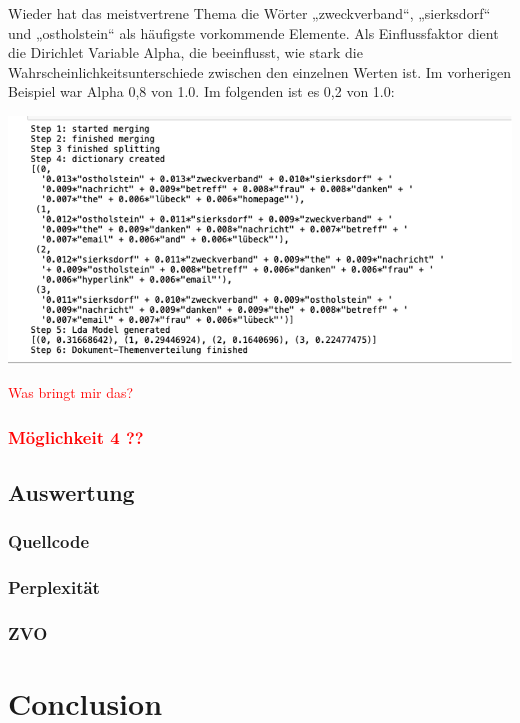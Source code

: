 \documentclass[german,version-2020-11]{uzl-thesis}
\begin{document}
Wieder hat das meistvertrene Thema die Wörter „zweckverband“, „sierksdorf“ und „ostholstein“ als häufigste vorkommende Elemente. Als Einflussfaktor dient die Dirichlet Variable Alpha, die beeinflusst, wie stark die Wahrscheinlichkeitsunterschiede zwischen den einzelnen Werten ist. Im vorherigen Beispiel war Alpha 0,8 von 1.0. Im folgenden ist es 0,2 von 1.0: 

\includegraphics[scale=0.5]{lda5.png}

\textcolor{red}{Was bringt mir das?}

\subsection{\textcolor{red}{Möglichkeit 4 ??}}

\section{Auswertung}
	\subsection{Quellcode}
	\subsection{Perplexität}
	\subsection{ZVO}

	

\chapter{Conclusion}
\end{document}
